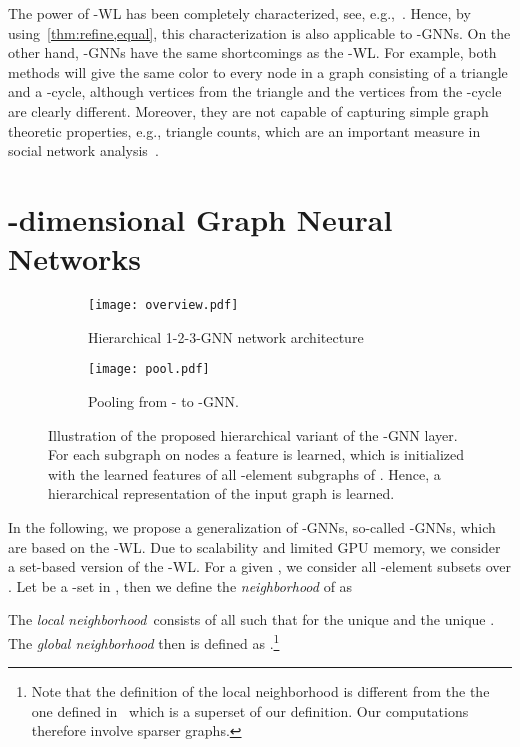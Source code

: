 \documentclass[letterpaper]{article}
\theoremstyle{definition}
\begin{document}
The power of -WL has been completely characterized, see, e.g.,~\cite{Arv+2015}.  
Hence, by using~\cref{thm:refine,equal}, this characterization is also applicable to -GNNs. 
On the other hand, -GNNs have the same shortcomings as the -WL. 
For example, both methods will give the same color to every node in a graph consisting of a triangle and a -cycle, although vertices from the triangle and the vertices from the -cycle are clearly different.
Moreover, they are not capable of capturing simple graph theoretic properties, e.g., triangle counts, which are an important measure in social network analysis~\cite{Mil+2002,New2003}.

\section{-dimensional Graph Neural Networks}

\begin{figure*}[t]
	\centering
	\begin{subfigure}[b]{0.65\linewidth}
		\centering
		\texttt{[image: overview.pdf]}
		\caption{Hierarchical 1-2-3-GNN network architecture}\label{fig:architecture}
	\end{subfigure}
	\hspace{-.5cm}
	\begin{subfigure}[b]{0.28\linewidth}
		\centering
		\texttt{[image: pool.pdf]}
		\caption{Pooling from - to -GNN.}\label{fig:pooling}
	\end{subfigure}
	\caption{Illustration of the proposed hierarchical variant of the -GNN layer. For each subgraph  on  nodes a feature  is learned, which is initialized with the learned features of all -element subgraphs of . Hence, a hierarchical representation of the input graph is learned.}\label{fig:overview}
\end{figure*}

In the following, we propose a generalization of -GNNs, so-called -GNNs, which are based on the -WL. Due to scalability and limited GPU memory, we consider a set-based version of the -WL. For a given , we consider all -element subsets  over . Let  be a -set in , then we define the \emph{neighborhood} of  as 

The \emph{local neighborhood}\,  consists of all  such that  for the unique  and the unique . The \emph{global neighborhood}  then is defined as .\footnote{Note that the definition of the local neighborhood is different from the the one defined in~\cite{Mor+2017} which is a superset of our definition. 
Our computations therefore involve sparser graphs.}
\end{document}
